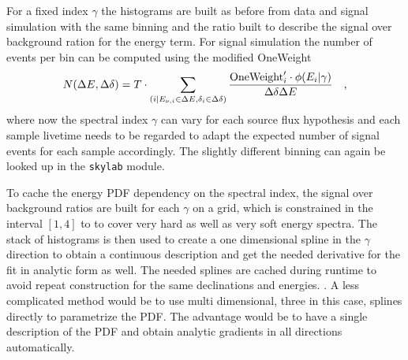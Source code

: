 For a fixed index $\gamma$ the histograms are built as before from data and signal simulation with the same binning and the ratio built to describe the signal over background ration for the energy term.
For signal simulation the number of events per bin can be computed using the modified OneWeight
\begin{equation}
  N(\Delta E, \Delta\delta)
  = T\cdot \sum_{(i|E_{\nu,i}\in\Delta E, \delta_i\in\Delta\delta)}
    \frac{\text{OneWeight}'_i \cdot \phi(E_i|\gamma)}{\Delta\delta \Delta E}
  \quad\text{,}
\end{equation}
where now the spectral index $\gamma$ can vary for each source flux hypothesis and each sample livetime needs to be regarded to adapt the expected number of signal events for each sample accordingly.
The slightly different binning can again be looked up in the \lstinline!skylab! module.

To cache the energy PDF dependency on the spectral index, the signal over background ratios are built for each $\gamma$ on a grid, which is constrained in the interval $[1, 4]$ to to cover very hard as well as very soft energy spectra.
The stack of histograms is then used to create a one dimensional spline in the $\gamma$ direction to obtain a continuous description and get the needed derivative for the fit in analytic form as well.
The needed splines are cached during runtime to avoid repeat construction for the same declinations and energies.
.
A less complicated method would be to use multi dimensional, three in this case, splines directly to parametrize the PDF.
The advantage would be to have a single description of the PDF and obtain analytic gradients in all directions automatically.


